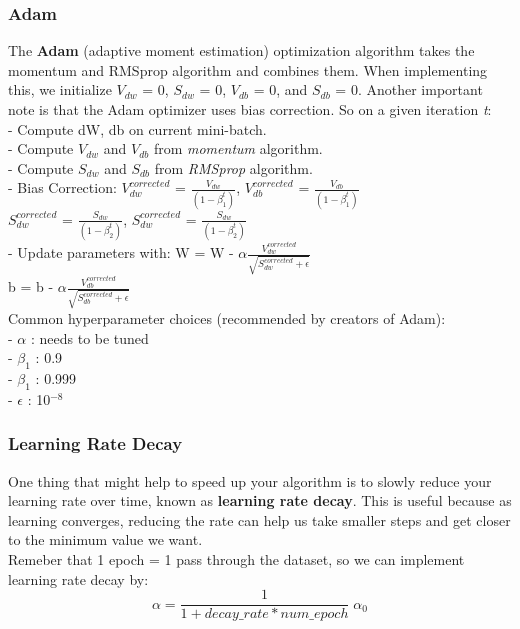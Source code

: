 \documentclass[11pt, a4paper]{article}
\begin{document}
\begin{spacing}{1.1}
	\subsubsection{Adam}
	The \textbf{Adam} (adaptive moment estimation) optimization algorithm takes the momentum and RMSprop algorithm and combines them. When implementing this, we initialize $V_{dw}$ = 0, $S_{dw}$ = 0, $V_{db}$ = 0, and $S_{db}$ = 0. Another important note is that the Adam optimizer uses bias correction. So on a given iteration \textit{t}: \\
	\hspace*{3mm} - Compute dW, db on current mini-batch. \\
	\hspace*{3mm} - Compute $V_{dw}$ and $V_{db}$ from \textit{momentum} algorithm. \\
	\hspace*{3mm} - Compute $S_{dw}$ and $S_{db}$ from \textit{RMSprop} algorithm. \\
	\hspace*{3mm} - Bias Correction: $V_{dw}^{corrected}$ = $\frac{V_{dw}}{(1-\beta^t_1)}$, $V_{db}^{corrected}$ = $\frac{V_{db}}{(1-\beta^t_1)}$ \\
	\hspace*{35mm} $S_{dw}^{corrected}$ = $\frac{S_{dw}}{(1-\beta^t_2)}$, $S_{dw}^{corrected}$ = $\frac{S_{dw}}{(1-\beta^t_2)}$ \\
	\hspace*{3mm} - Update parameters with: W = W - $\alpha \frac{V_{dw}^{corrected}}{\sqrt{S_{dw}^{corrected}+ \epsilon}}$ \\
	\hspace*{50mm} b = b - $\alpha \frac{V_{db}^{corrected}}{\sqrt{S_{db}^{corrected}+ \epsilon}}$ \vspace*{3mm} \\
	Common hyperparameter choices (recommended by creators of Adam): \\
	\hspace*{3mm} - $\alpha$ : needs to be tuned \\
	\hspace*{3mm} - $\beta_1$ : 0.9 \\
	\hspace*{3mm} - $\beta_1$ : 0.999 \\
	\hspace*{3mm} - $\epsilon$ : 10$^{-8}$ \newpage

	\subsubsection{Learning Rate Decay}
	One thing that might help to speed up your algorithm is to slowly reduce your learning rate over time, known as \textbf{learning rate decay}. This is useful because as learning converges, reducing the rate can help us take smaller steps and get closer to the minimum value we want. \vspace*{1mm} \\
	Remeber that 1 epoch = 1 pass through the dataset, so we can implement learning rate decay by: $$ \alpha = \frac{1}{1+ decay\_rate * num\_epoch}\; \alpha_0$$ 

\end{spacing}
\end{document}
